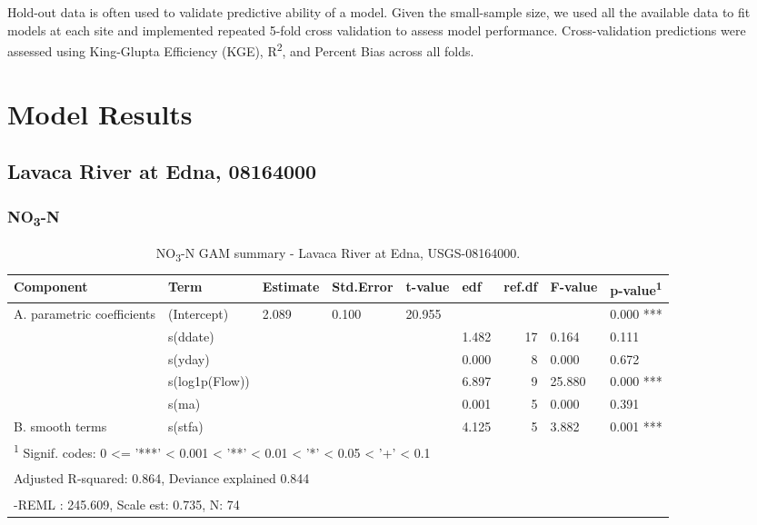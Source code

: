 \documentclass[
]{article}
\newenvironment{widestuff}{\begin{table}[h]\begin{adjustwidth}{-4.5cm}{-4.5cm}\centering}{\end{adjustwidth}\end{table}}
\begin{document}
Hold-out data is often used to validate predictive ability of a model.
Given the small-sample size, we used all the available data to fit
models at each site and implemented repeated 5-fold cross validation to
assess model performance. Cross-validation predictions were assessed
using King-Glupta Efficiency (KGE), R\textsuperscript{2}, and Percent
Bias across all folds.

\hypertarget{model-results}{%
\section{Model Results}\label{model-results}}

\hypertarget{lavaca-river-at-edna-08164000}{%
\subsection{Lavaca River at Edna,
08164000}\label{lavaca-river-at-edna-08164000}}

\hypertarget{no3-n}{%
\subsubsection{\texorpdfstring{NO\textsubscript{3}-N}{NO3-N}}\label{no3-n}}

\begin{widestuff}

\caption{NO\textsubscript{3}-N GAM summary - Lavaca River at Edna, USGS-08164000.}
\centering
\begin{tabular}[t]{llllllrll}
\toprule
Component & Term & Estimate & Std.Error & t-value & edf & ref.df & F-value & p-value\textsuperscript{1}\\
\midrule
A. parametric coefficients & (Intercept) & 2.089 & 0.100 & 20.955 &  &  &  & 0.000 ***\\
\cmidrule{1-9}
 & s(ddate) &  &  &  & 1.482 & 17 & 0.164 & 0.111\\

 & s(yday) &  &  &  & 0.000 & 8 & 0.000 & 0.672\\

 & s(log1p(Flow)) &  &  &  & 6.897 & 9 & 25.880 & 0.000 ***\\

 & s(ma) &  &  &  & 0.001 & 5 & 0.000 & 0.391\\

\multirow[t]{-5}{*}{\raggedright\arraybackslash B. smooth terms} & s(stfa) &  &  &  & 4.125 & 5 & 3.882 & 0.001 ***\\
\bottomrule
\multicolumn{9}{l}{\textsuperscript{1} Signif. codes: 0 <= '***' < 0.001 < '**' < 0.01 < '*' < 0.05 < '+' < 0.1}\\
\multicolumn{9}{l}{\textsuperscript{} Adjusted R-squared: 0.864, Deviance explained 0.844}\\
\multicolumn{9}{l}{\textsuperscript{} -REML : 245.609, Scale est: 0.735, N: 74}\\
\end{tabular}
\end{widestuff}
\end{document}
